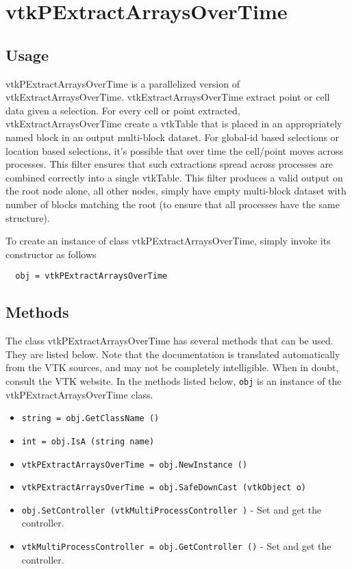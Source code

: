 \section{vtkPExtractArraysOverTime}

\subsection{Usage}

 vtkPExtractArraysOverTime is a parallelized version of
 vtkExtractArraysOverTime. 
 vtkExtractArraysOverTime extract point or cell data given a selection. For
 every cell or point extracted, vtkExtractArraysOverTime create a vtkTable
 that is placed in an appropriately named block in an output multi-block
 dataset. For global-id based selections or location based selections, it's
 possible that over time the cell/point moves across processes. This filter
 ensures that such extractions spread across processes are combined correctly
 into a single vtkTable.
 This filter produces a valid output on the root node alone, all other nodes,
 simply have empty multi-block dataset with number of blocks matching the root
 (to ensure that all processes have the same structure).

To create an instance of class vtkPExtractArraysOverTime, simply
invoke its constructor as follows
\begin{verbatim}
  obj = vtkPExtractArraysOverTime
\end{verbatim}
\subsection{Methods}

The class vtkPExtractArraysOverTime has several methods that can be used.
  They are listed below.
Note that the documentation is translated automatically from the VTK sources,
and may not be completely intelligible.  When in doubt, consult the VTK website.
In the methods listed below, \verb|obj| is an instance of the vtkPExtractArraysOverTime class.
\begin{itemize}
\item  \verb|string = obj.GetClassName ()|

\item  \verb|int = obj.IsA (string name)|

\item  \verb|vtkPExtractArraysOverTime = obj.NewInstance ()|

\item  \verb|vtkPExtractArraysOverTime = obj.SafeDownCast (vtkObject o)|

\item  \verb|obj.SetController (vtkMultiProcessController )| -  Set and get the controller.

\item  \verb|vtkMultiProcessController = obj.GetController ()| -  Set and get the controller.

\end{itemize}
